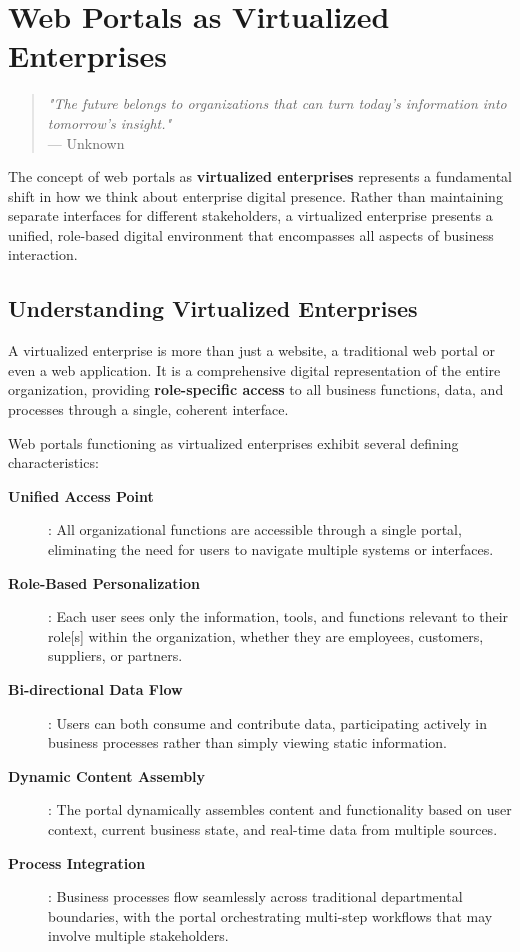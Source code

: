 
\chapter{Web Portals as Virtualized Enterprises}
\label{chap:virtualized-enterprises}

\begin{quote}
\textit{"The future belongs to organizations that can turn today's information into tomorrow's insight."} \\
— Unknown
\end{quote}

The concept of web portals as \textbf{virtualized enterprises} represents a fundamental shift in how we think about enterprise digital presence. Rather than maintaining separate interfaces for different stakeholders, a virtualized enterprise presents a unified, role-based digital environment that encompasses all aspects of business interaction.

\section{Understanding Virtualized Enterprises}
\label{sec:understanding-virtualized}

A virtualized enterprise is more than just a website, a traditional web portal or even a web application. It is a comprehensive digital representation of the entire organization, providing \textbf{role-specific access} to all business functions, data, and processes through a single, coherent interface.

Web portals functioning as virtualized enterprises exhibit several defining characteristics:

\begin{description}
\item[\textbf{Unified Access Point}]: All organizational functions are accessible through a single portal, eliminating the need for users to navigate multiple systems or interfaces.

\item[\textbf{Role-Based Personalization}]: Each user sees only the information, tools, and functions relevant to their role[s] within the organization, whether they are employees, customers, suppliers, or partners.

\item[\textbf{Bi-directional Data Flow}]: Users can both consume and contribute data, participating actively in business processes rather than simply viewing static information.

\item[\textbf{Dynamic Content Assembly}]: The portal dynamically assembles content and functionality based on user context, current business state, and real-time data from multiple sources.

\item[\textbf{Process Integration}]: Business processes flow seamlessly across traditional departmental boundaries, with the portal orchestrating multi-step workflows that may involve multiple stakeholders.
\end{description}

